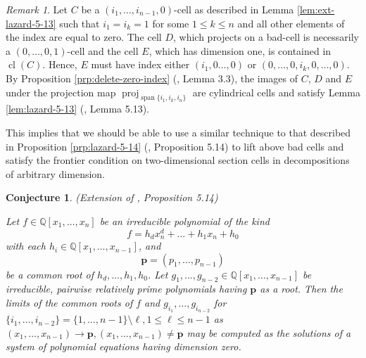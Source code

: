 \documentclass[
]{book}
\newtheorem{conjecture}{Conjecture}[chapter]
\theoremstyle{definition}
\theoremstyle{definition}
\theoremstyle{definition}
\theoremstyle{definition}
\theoremstyle{remark}
\newtheorem*{remark}{Remark}
\begin{document}
\begin{remark}
Let \(C\) be a \((i_1,\ldots,i_{n-1},0)\)-cell as described in Lemma \ref{lem:ext-lazard-5-13} such that \(i_1=i_k = 1\) for some \(1 \le k \le n\) and all other elements of the index are equal to zero.
The cell \(D\), which projects on a bad-cell is necessarily a \((0,\ldots,0,1)\)-cell and the cell \(E\), which has dimension one, is contained in \({\operatorname{cl} \left( C \right)}\). Hence, \(E\) must have index either \((i_1,0\ldots,0)\) or \((0,\ldots,0,i_k,0,\ldots,0)\).
By Proposition \ref{prp:delete-zero-index} (\citet{bgv15}, Lemma 3.3), the images of \(C\), \(D\) and \(E\) under the projection map \({\operatorname{proj}_{{\operatorname{span} \{i_1,i_k,i_n\}}}}\) are cylindrical cells and satisfy Lemma \ref{lem:lazard-5-13} (\citet{lazard10}, Lemma 5.13).
\end{remark}

This implies that we should be able to use a similar technique to that described in Proposition \ref{prp:lazard-5-14} (\citet{lazard10}, Proposition 5.14) to lift above bad cells and satisfy the frontier condition on two-dimensional section cells in decompositions of arbitrary dimension.

\begin{conjecture}
\protect\hypertarget{cnj:ext-lazard-5-14}{}\label{cnj:ext-lazard-5-14}(Extension of \citet{lazard10}, Proposition 5.14)

Let \(f \in \mathbb{Q}[x_1,\ldots,x_n]\) be an irreducible polynomial of the kind
\[f = h_dx_n^d + \ldots + h_1x_n + h_0\]
with each \(h_i \in \mathbb{Q}[x_1,\ldots,x_{n-1}]\), and
\[\mathbf{p} = (p_1,\ldots,p_{n-1})\]
be a common root of \(h_d,\ldots,h_1,h_0\).
Let \(g_1,\ldots,g_{n-2}\in \mathbb{Q}[x_1,\ldots,x_{n-1}]\) be irreducible, pairwise relatively prime polynomials having \(\mathbf{p}\) as a root.
Then the limits of the common roots of \(f\) and \(g_{i_1},\ldots,g_{i_{n-2}}\) for \(\{i_1,\ldots,i_{n-2}\} = \{1,\ldots,n-1\} \setminus \ell, 1 \le \ell \le n-1\) as \((x_1, \ldots,x_{n-1}) \to \mathbf{p}, (x_1, \ldots, x_{n-1}) \ne \mathbf{p}\) may be computed as the solutions of a system of polynomial equations having dimension zero.
\end{conjecture}
\end{document}

